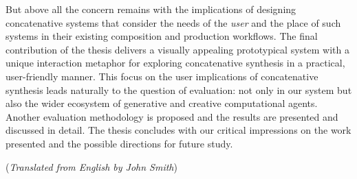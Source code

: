 But above all the concern remains with the implications of designing concatenative systems that consider the needs of the \textit{user} and the place of such systems in their existing composition and production workflows. The final contribution of the thesis delivers a visually appealing prototypical system with a unique interaction metaphor for exploring concatenative synthesis in a practical, user-friendly manner. This focus on the user implications of concatenative synthesis leads naturally to the question of evaluation: not only in our system but also the wider ecosystem of generative and creative computational agents. Another evaluation methodology is proposed and the results are presented and discussed in detail. The thesis concludes with our critical impressions on the work presented and the possible directions for future study.

\vfill
{\noindent (\emph{Translated from English by John Smith})}